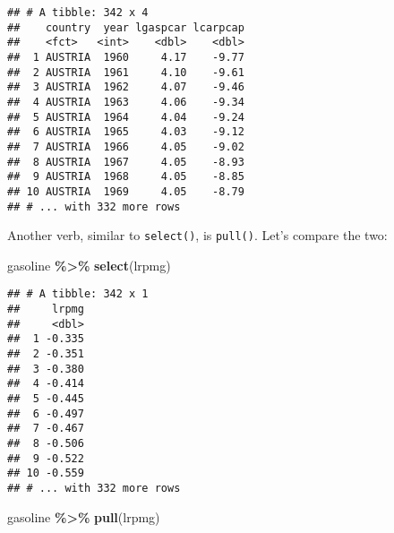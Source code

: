 \documentclass[
]{article}
\newenvironment{Shaded}{\begin{snugshade}}{\end{snugshade}}
\newcommand{\KeywordTok}[1]{\textcolor[rgb]{0.13,0.29,0.53}{\textbf{#1}}}
\newcommand{\NormalTok}[1]{#1}
\newcommand{\OperatorTok}[1]{\textcolor[rgb]{0.81,0.36,0.00}{\textbf{#1}}}
\newcommand{\StringTok}[1]{\textcolor[rgb]{0.31,0.60,0.02}{#1}}
\begin{document}
\begin{verbatim}
## # A tibble: 342 x 4
##    country  year lgaspcar lcarpcap
##    <fct>   <int>    <dbl>    <dbl>
##  1 AUSTRIA  1960     4.17    -9.77
##  2 AUSTRIA  1961     4.10    -9.61
##  3 AUSTRIA  1962     4.07    -9.46
##  4 AUSTRIA  1963     4.06    -9.34
##  5 AUSTRIA  1964     4.04    -9.24
##  6 AUSTRIA  1965     4.03    -9.12
##  7 AUSTRIA  1966     4.05    -9.02
##  8 AUSTRIA  1967     4.05    -8.93
##  9 AUSTRIA  1968     4.05    -8.85
## 10 AUSTRIA  1969     4.05    -8.79
## # ... with 332 more rows
\end{verbatim}

Another verb, similar to \texttt{select()}, is \texttt{pull()}. Let's compare the two:

\begin{Shaded}
\begin{Highlighting}[]
\NormalTok{gasoline }\OperatorTok{\%\textgreater{}\%}\StringTok{ }\KeywordTok{select}\NormalTok{(lrpmg)}
\end{Highlighting}
\end{Shaded}

\begin{verbatim}
## # A tibble: 342 x 1
##     lrpmg
##     <dbl>
##  1 -0.335
##  2 -0.351
##  3 -0.380
##  4 -0.414
##  5 -0.445
##  6 -0.497
##  7 -0.467
##  8 -0.506
##  9 -0.522
## 10 -0.559
## # ... with 332 more rows
\end{verbatim}

\begin{Shaded}
\begin{Highlighting}[]
\NormalTok{gasoline }\OperatorTok{\%\textgreater{}\%}\StringTok{ }\KeywordTok{pull}\NormalTok{(lrpmg)}
\end{Highlighting}
\end{Shaded}
\end{document}
